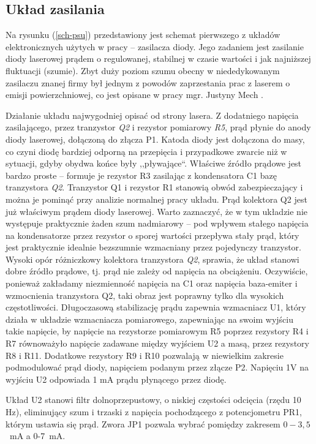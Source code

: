 \documentclass[a4paper,10pt]{article}
\begin{document}
\subsection{Układ zasilania}

Na rysunku (\ref{sch-psu}) przedstawiony jest schemat pierwszego z układów elektronicznych użytych w pracy -- zasilacza diody. Jego zadaniem jest zasilanie diody laserowej prądem o regulowanej, stabilnej w czasie wartości i jak najniższej fluktuacji (szumie). Zbyt duży poziom szumu obecny w niededykowanym zasilaczu znanej firmy był jednym z powodów zaprzestania prac z laserem o emisji powierzchniowej, co jest opisane w pracy mgr. Justyny Mech \cite{mgrJustynaMech}.

Działanie układu najwygodniej opisać od strony lasera. Z dodatniego napięcia zasilającego, przez tranzystor \textit{Q2} i rezystor pomiarowy \textit{R5}, prąd płynie do anody diody laserowej, dołączoną do złącza P1. Katoda diody jest dołączona do masy, co czyni diodę bardziej odporną na przepięcia i przypadkowe zwarcie niż w sytuacji, gdyby obydwa końce były ,,pływające``.  
Właściwe źródło prądowe jest bardzo proste -- formuje je rezystor R3 zasilając z kondensatora C1 bazę tranzystora \textit{Q2}. Tranzystor Q1 i rezystor R1 stanowią obwód zabezpieczający i można je pominąć przy analizie normalnej pracy układu. Prąd kolektora Q2 jest już właściwym prądem diody laserowej. Warto zaznaczyć, że w tym układzie nie występuje praktycznie żaden szum nadmiarowy -- pod wpływem stałego napięcia na kondensatorze przez rezystor o sporej wartości przepływa stały prąd, który jest praktycznie idealnie bezszumnie wzmacniany przez pojedynczy tranzystor. Wysoki opór różniczkowy kolektora tranzystora \textit{Q2}, sprawia, że układ stanowi dobre źródło prądowe, tj. prąd nie zależy od napięcia na obciążeniu. Oczywiście, ponieważ zakładamy niezmienność napięcia na C1 oraz napięcia baza-emiter i wzmocnienia tranzystora Q2, taki obraz jest poprawny tylko dla wysokich częstotliwości. Długoczasową stabilizację prądu zapewnia wzmacniacz U1, który działa w układzie wzmacniacza pomiarowego, zapewniając na swoim wyjściu takie napięcie, by napięcie na rezystorze pomiarowym R5 poprzez rezystory R4 i R7 równoważyło napięcie zadawane między wyjściem U2 a masą, przez rezystory  R8 i R11.
Dodatkowe rezystory R9 i R10 pozwalają w niewielkim zakresie podmodulować prąd diody, napięciem podanym przez złącze P2.
Napięciu 1V na wyjściu U2 odpowiada 1 mA prądu płynącego przez diodę.

Układ U2 stanowi filtr dolnoprzepustowy, o niskiej częstości odcięcia (rzędu 10 Hz), eliminujący szum i trzaski z napięcia pochodzącego z potencjometru PR1, którym ustawia się prąd. Zwora JP1 pozwala wybrać pomiędzy zakresem $0-3{,}5$~mA a 0-7~mA.
\end{document}
